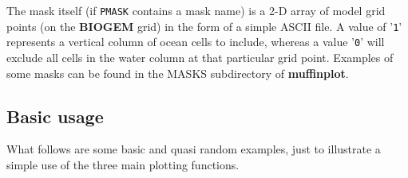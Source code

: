 \documentclass[11pt,fleqn]{book} %
\begin{document}
The mask itself (if \texttt{PMASK} contains a mask name) is a 2-D array of model grid points (on the \textbf{BIOGEM} grid) in the form of a simple ASCII file. A value of '\texttt{1}' represents a vertical column of ocean cells to include, whereas a value '\texttt{0}' will exclude all cells in the water column at that particular grid point. Examples of some masks can be found in the \footnotesize\textsf{MASKS }\normalsize subdirectory of \textbf{muffinplot}.

%
\pagebreak

\subsection{Basic usage}

What follows are some basic and quasi random examples, just to illustrate a simple use of the three main plotting functions.
\end{document}
